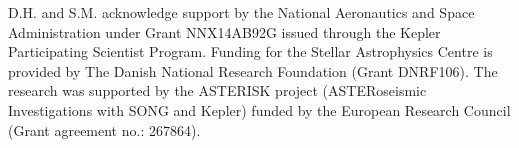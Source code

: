 \documentclass[twocolumn,tighten]{aastex61}
\renewcommand{\_}{\discretionary{\underscore}{}{\underscore}}  %
\begin{document}
D.H. and S.M. acknowledge support by the National Aeronautics and Space Administration under Grant NNX14AB92G issued through the Kepler Participating Scientist Program.
Funding for the Stellar Astrophysics Centre is provided by The Danish National Research Foundation (Grant DNRF106). The research was supported by the ASTERISK project (ASTERoseismic Investigations with SONG and Kepler) funded by the European Research Council (Grant agreement no.: 267864).

%




\appendix
\twocolumngrid




\clearpage
\end{document}
